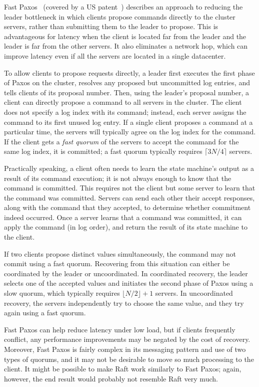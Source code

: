 Fast Paxos~\cite{Lamport:2006} (covered by a US
patent~\cite{Lamport:2009})
describes an approach to reducing the
leader bottleneck in which clients propose commands directly to the
cluster servers, rather than submitting them to the leader to propose.
This is advantageous for latency when the client is located far from the
leader and the leader is far from the other servers. It also eliminates
a network hop, which can improve latency even if all the servers are
located in a single datacenter.

To allow clients to propose requests directly, a leader first executes
the first phase of Paxos on the cluster, resolves any proposed but
uncommitted log entries, and tells clients of its proposal number. 
Then, using the leader's proposal number, a client
can directly propose a command to all servers in the cluster. The
client does not specify a log index with its command; instead, each
server assigns the command to its first unused log entry. If a single
client proposes a command at a particular time, the servers will
typically agree on the log index for the command. If the client gets
a \emph{fast quorum} of the servers to accept the command for the same log
index, it is committed; a fast quorum typically requires
$\lceil 3N/4 \rceil$ servers.

Practically speaking, a client often needs to learn the state machine's
output as a result of its command execution; it is not always enough to
know that the command is committed. This requires not the client but
some server to learn that the command was committed.
Servers can send each other their accept responses, along with the
command that they accepted, to determine whether commitment indeed
occurred. Once a server learns that a command was committed, it can
apply the command (in log order), and return the result of its state
machine to the client.

If two clients propose distinct values simultaneously, the
command may not commit using a fast quorum. Recovering from this
situation can either be coordinated by the leader or uncoordinated. In
coordinated recovery, the leader selects one of the accepted values and
initiates the second phase of Paxos using a slow quorum, which typically
requires $\lfloor N/2 \rfloor + 1$ servers. In uncoordinated recovery,
the servers independently try to choose the same value, and they try
again using a fast quorum.

Fast Paxos can help reduce latency under low load, but if clients
frequently conflict, any performance improvements may be negated by the
cost of recovery. Moreover, Fast Paxos is fairly complex in its
messaging pattern and use of two types of quorums, and it may not be
desirable to move so much processing to the client. It might be possible
to make Raft work similarly to Fast Paxos; again, however, the
end result would probably not resemble Raft very much.

